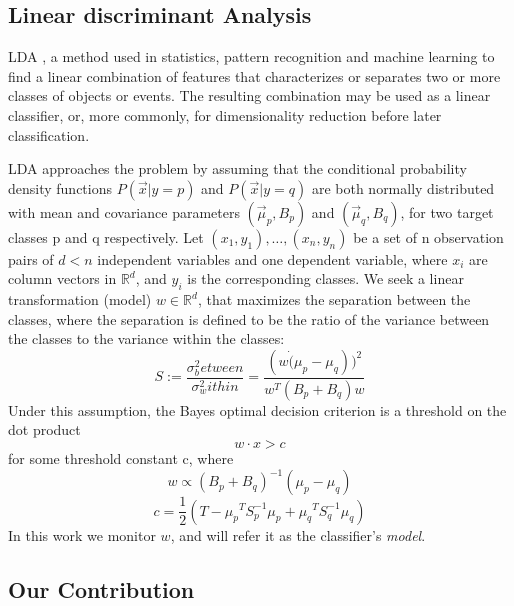 \documentclass[11pt,twocolumn,varwidth=true,a4paper,fleqn]{article}
\begin{document}
\subsection{Linear discriminant Analysis}
\par LDA \cite{fisher1936use}, a method used in statistics, 
pattern recognition and machine learning to find a linear combination of features 
that characterizes or separates two or more classes of objects or events. 
The resulting combination may be used as a linear classifier, or, 
more commonly, for dimensionality reduction before later classification.
\\\par LDA approaches the problem by assuming that the conditional probability
density functions $P(\vec x|y=p)$ and $P(\vec x|y=q)$ are both normally distributed with 
mean and covariance parameters $\left(\vec \mu_p, B_p\right)$ and 
$\left(\vec \mu_q, B_q\right)$, for two target classes p and q respectively.
Let ${(x_1,y_1),\ldots,(x_n,y_n)}$ be a set of n observation pairs
of $d < n$ independent variables and one dependent variable,
where $x_i$ are column vectors in $\mathbb{R}^d$, and $y_i$ is the
corresponding classes. 
We seek a linear transformation (model) $w \in \mathbb{R}^d $,
that maximizes the separation between the classes, where the separation is
defined to be the ratio of the variance between the classes to the variance
within the classes:
\begin{equation*}
S := \frac{\sigma^2_between}{\sigma^2_within} = \frac{(w \dot (\mu_p -
\mu_q))^2}{w^T(B_p+B_q)w}
\end{equation*}
Under this assumption, the Bayes optimal decision criterion is a threshold on the 
dot product
\begin{equation*} \label{eq:decision}
w \cdot x > c
\end{equation*}
for some threshold constant c, where
\begin{equation} \label{eq:w}
w \propto (B_p+B_q)^{-1}(\mu_p - \mu_q)
\end{equation}
\begin{equation} \label{eq:c}
c = \frac{1}{2}(T-{\mu_p}^T S_p^{-1} {\mu_p}+{\mu_q}^T S_q^{-1} {\mu_q})
\end{equation}
In this work we monitor $w$, and will refer it as the
classifier's \textit{model}.
\subsection{Our Contribution}
\end{document}
